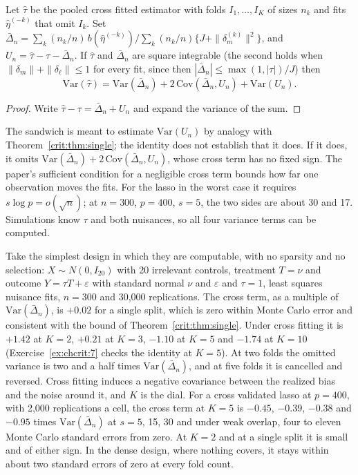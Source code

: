\begin{proposition}\label{crit:prop:cfvar}
Let $\hat\tau$ be the pooled cross fitted estimator with folds $I_1, \dots, I_K$ of sizes $n_k$ and fits $\hat\eta^{(-k)}$ that omit $I_k$. Set $\bar\Delta_n = \sum_k (n_k/n)\,b(\hat\eta^{(-k)})\big/\sum_k (n_k/n)\{J + \|\delta_m^{(k)}\|^2\}$, and $U_n = \hat\tau - \tau - \bar\Delta_n$. If $\hat\tau$ and $\bar\Delta_n$ are square integrable (the second holds when $\|\delta_m\| + \|\delta_\ell\| \le 1$ for every fit, since then $|\bar\Delta_n| \le \max(1, |\tau|)/J$) then
\begin{equation}
\mathrm{Var}(\hat\tau) = \mathrm{Var}(\bar\Delta_n) + 2\,\mathrm{Cov}(\bar\Delta_n, U_n) + \mathrm{Var}(U_n).
\label{eq:crit:cfvar}
\end{equation}
\end{proposition}
\begin{proof}
Write $\hat\tau - \tau = \bar\Delta_n + U_n$ and expand the variance of the sum.
\end{proof}

The sandwich is meant to estimate $\mathrm{Var}(U_n)$ by analogy with Theorem~\ref{crit:thm:single}; the identity does not establish that it does. If it does, it omits $\mathrm{Var}(\bar\Delta_n) + 2\,\mathrm{Cov}(\bar\Delta_n, U_n)$, whose cross term has no fixed sign. The paper's sufficient condition for a negligible cross term bounds how far one observation moves the fits. For the lasso in the worst case it requires $s\log p = o(\sqrt n)$; at $n = 300$, $p = 400$, $s = 5$, the two sides are about 30 and 17. Simulations know $\tau$ and both nuisances, so all four variance terms can be computed.

Take the simplest design in which they are computable, with no sparsity and no selection: $X \sim N(0, I_{20})$ with 20 irrelevant controls, treatment $T = \nu$ and outcome $Y = \tau T + \varepsilon$ with standard normal $\nu$ and $\varepsilon$ and $\tau = 1$, least squares nuisance fits, $n = 300$ and 30,000 replications. The cross term, as a multiple of $\mathrm{Var}(\bar\Delta_n)$, is $+0.02$ for a single split, which is zero within Monte Carlo error and consistent with the bound of Theorem~\ref{crit:thm:single}. Under cross fitting it is $+1.42$ at $K = 2$, $+0.21$ at $K = 3$, $-1.10$ at $K = 5$ and $-1.74$ at $K = 10$ (Exercise~\ref{ex:chcrit:7} checks the identity at $K = 5$). At two folds the omitted variance is two and a half times $\mathrm{Var}(\bar\Delta_n)$, and at five folds it is cancelled and reversed. Cross fitting induces a negative covariance between the realized bias and the noise around it, and $K$ is the dial. For a cross validated lasso at $p = 400$, with 2,000 replications a cell, the cross term at $K = 5$ is $-0.45$, $-0.39$, $-0.38$ and $-0.95$ times $\mathrm{Var}(\bar\Delta_n)$ at $s = 5$, 15, 30 and under weak overlap, four to eleven Monte Carlo standard errors from zero. At $K = 2$ and at a single split it is small and of either sign. In the dense design, where nothing covers, it stays within about two standard errors of zero at every fold count.

